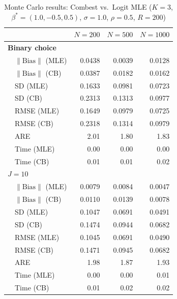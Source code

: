 \begin{table}[t]
\centering
\caption{Monte Carlo results: Combest vs.\ Logit MLE ($K=3$, $\beta^*=(1.0,-0.5,0.5)$, $\sigma=1.0$, $\rho=0.5$, $R=200$)}
\label{tab:unit_demand_logit_efficiency}
\small
\begin{tabular}{llrrr}
\toprule
 & & $N=200$ & $N=500$ & $N=1000$ \\
\midrule
\multicolumn{5}{l}{\textbf{Binary choice}} \\[2pt]
  & $\|\text{Bias}\|$ (MLE) & 0.0438 & 0.0039 & 0.0128 \\
  & $\|\text{Bias}\|$ (CB) & 0.0387 & 0.0182 & 0.0162 \\
  & SD (MLE) & 0.1633 & 0.0981 & 0.0723 \\
  & SD (CB) & 0.2313 & 0.1313 & 0.0977 \\
  & RMSE (MLE) & 0.1649 & 0.0979 & 0.0725 \\
  & RMSE (CB) & 0.2318 & 0.1314 & 0.0979 \\
  & ARE & 2.01 & 1.80 & 1.83 \\
  & Time (MLE) & 0.00 & 0.00 & 0.00 \\
  & Time (CB) & 0.01 & 0.01 & 0.02 \\
\midrule
\multicolumn{5}{l}{\textbf{$J=10$}} \\[2pt]
  & $\|\text{Bias}\|$ (MLE) & 0.0079 & 0.0084 & 0.0047 \\
  & $\|\text{Bias}\|$ (CB) & 0.0110 & 0.0139 & 0.0078 \\
  & SD (MLE) & 0.1047 & 0.0691 & 0.0491 \\
  & SD (CB) & 0.1474 & 0.0944 & 0.0682 \\
  & RMSE (MLE) & 0.1045 & 0.0691 & 0.0490 \\
  & RMSE (CB) & 0.1471 & 0.0945 & 0.0682 \\
  & ARE & 1.98 & 1.87 & 1.93 \\
  & Time (MLE) & 0.00 & 0.00 & 0.01 \\
  & Time (CB) & 0.01 & 0.02 & 0.02 \\
\bottomrule
\end{tabular}
\end{table}